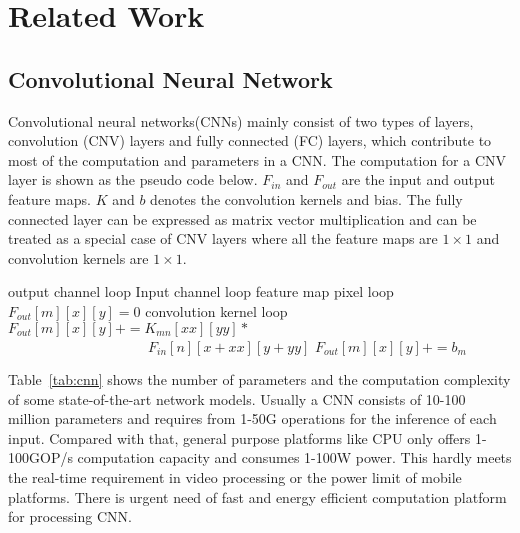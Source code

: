 \section{Related Work}\label{sec:related}


\subsection{Convolutional Neural Network}
Convolutional neural networks(CNNs) mainly consist of two types of layers, convolution (CNV) layers and fully connected (FC) layers, which contribute to most of the computation and parameters in a CNN. The computation for a CNV layer is shown as the pseudo code below. $F_{in}$ and $F_{out}$ are the input and output feature maps. $K$ and $b$ denotes the convolution kernels and bias. The fully connected layer can be expressed as matrix vector multiplication and can be treated as a special case of CNV layers where all the feature maps are $1\times 1$ and convolution kernels are $1\times 1$.

\begin{codebox}
\li {} \Comment output channel loop
  \Do
\li   {} \Comment Input channel loop
    \Do
\li  	\Comment feature map pixel loop
\li 	{}
    \Do
\li   	  $F_{out}[m][x][y]=0$
\li 	  \Comment convolution kernel loop
\li 	  {}
          \Do
\li 		$F_{out}[m][x][y] += K_{mn}[xx][yy]*$\\
      $\qquad\qquad\qquad\qquad\qquad F_{in}[n][x+xx][y+yy] $
          \End
\li 	  $F_{out}[m][x][y]+=b_m$
        \End 
    \End
    \End 
\end{codebox}

Table~\ref{tab:cnn} shows the number of parameters and the computation complexity of some state-of-the-art network models. Usually a CNN consists of 10-100 million parameters and requires from 1-50G operations for the inference of each input. Compared with that, general purpose platforms like CPU only offers 1-100GOP/s computation capacity and consumes 1-100W power. This hardly meets the real-time requirement in video processing or the power limit of mobile platforms. There is urgent need of fast and energy efficient computation platform for processing CNN.



